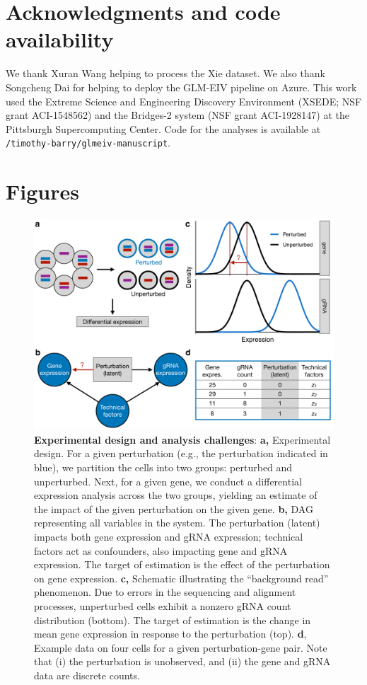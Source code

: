 \documentclass[12pt]{article}
\begin{document}
\section{Acknowledgments and code availability}
We thank Xuran Wang helping to process the Xie dataset. We also thank Songcheng Dai for helping to deploy the GLM-EIV pipeline on Azure. This work used the Extreme Science and Engineering Discovery Environment (XSEDE; NSF grant ACI-1548562) and the Bridges-2 system (NSF grant ACI-1928147) at the Pittsburgh Supercomputing Center. Code for the analyses is available at \texttt{/timothy-barry/glmeiv-manuscript}.

\printbibliography

\clearpage
\section*{Figures}
\begin{figure}[h!]
	\centering
	\includegraphics[width=1\linewidth]{../../figures/analysis_challenges/plot.pdf}
	\caption{\textbf{Experimental design and analysis challenges}: \textbf{a,} Experimental design. For a given perturbation (e.g., the perturbation indicated in blue), we partition the cells into two groups: perturbed and unperturbed. Next, for a given gene, we conduct a differential expression analysis across the two groups, yielding an estimate of the impact of the given perturbation on the given gene. \textbf{b,} DAG representing all variables in the system. The perturbation (latent) impacts both gene expression and gRNA expression; technical factors act as confounders, also impacting gene and gRNA expression. The target of estimation is the effect of the perturbation on gene expression. \textbf{c,} Schematic illustrating the ``background read'' phenomenon. Due to errors in the sequencing and alignment processes, unperturbed cells exhibit a nonzero gRNA count distribution (bottom). The target of estimation is the change in mean gene expression in response to the perturbation (top). \textbf{d}, Example data on four cells for a given perturbation-gene pair. Note that (i) the perturbation is unobserved, and (ii) the gene and gRNA data are discrete counts.}
	\label{analysis_challenges}
\end{figure}
\end{document}
